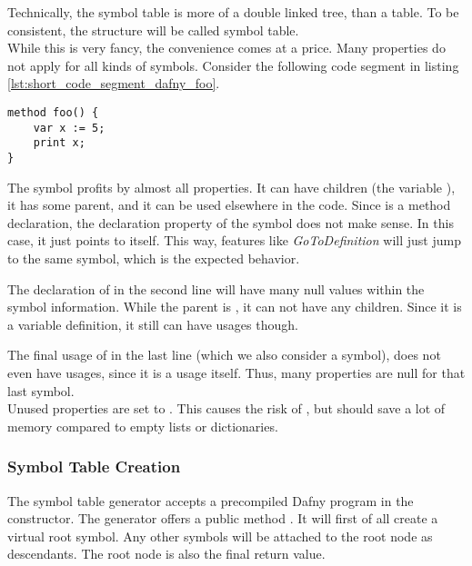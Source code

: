 Technically, the symbol table is more of a double linked tree, than a table.
To be consistent, the structure will be called symbol table.\\

While this is very fancy, the convenience comes at a price.
Many properties do not apply for all kinds of symbols.
Consider the following code segment in listing \ref{lst:short_code_segment_dafny_foo}.

\begin{lstlisting}[language=dafny, caption={Example Code Regarding Symbol Information}, captionpos=b, label={lst:short_code_segment_dafny_foo}]
method foo() {
    var x := 5;
    print x;
}
\end{lstlisting}

The symbol  profits by almost all properties.
It can have children (the variable ), it has some parent, and it can be used elsewhere in the code.
Since  is a method declaration, the declaration property of the symbol does not make sense.
In this case, it just points to itself.
This way, features like \textit{GoToDefinition} will just jump to the same symbol, which is the expected behavior.

The declaration of  in the second line will have many null values within the symbol information.
While the parent is , it can not have any children.
Since it is a variable definition, it still can have usages though.

The final usage of  in the last line (which we also consider a symbol), does not even have usages, since it is a usage itself.
Thus, many properties are null for that last symbol.\\

Unused properties are set to .
This causes the risk of , but should save a lot of memory compared to empty lists or dictionaries.\\

\subsubsection{Symbol Table Creation}
The symbol table generator accepts a precompiled Dafny program in the constructor.
The generator offers a public method .
It will first of all create a virtual root symbol.
Any other symbols will be attached to the root node as descendants.
The root node is also the final return value.\\

